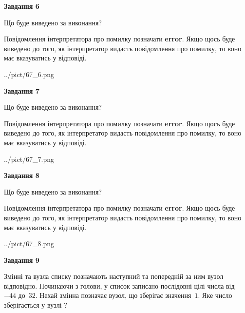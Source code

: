 \documentclass[12pt, ukrainian]{article}
\begin{document}
{\begin {large}
{\begin {center}\textbf{Завдання 6}\end {center}}\par
Що буде виведено за виконання?

Повідомлення інтерпретатора про помилку позначати \textbf{error}.
Якщо щось буде виведено до того, як інтерпретатор видасть повідомлення про помилку, 
то воно має вказуватись у відповіді. \par


\begin{center}
	{../pict/67_6.png}
\end{center}
\newpage

{\begin {center}\textbf{Завдання 7}\end {center}}\par
Що буде виведено за виконання?

Повідомлення інтерпретатора про помилку позначати \textbf{error}.
Якщо щось буде виведено до того, як інтерпретатор видасть повідомлення про помилку, 
то воно має вказуватись у відповіді. \par


\begin{center}
	{../pict/67_7.png}
\end{center}
\newpage

{\begin {center}\textbf{Завдання 8}\end {center}}\par
Що буде виведено за виконання?

Повідомлення інтерпретатора про помилку позначати \textbf{error}.
Якщо щось буде виведено до того, як інтерпретатор видасть повідомлення про помилку, 
то воно має вказуватись у відповіді. \par


\begin{center}
	{../pict/67_8.png}
\end{center}
\newpage

{\begin {center}\textbf{Завдання 9}\end {center}}\par
Змінні  та  вузла списку позначають наступний та попередній за ним вузол відповідно. Починаючи з голови, у список записано послідовні цілі числа від~$-44$ до~$32$. Нехай змінна  позначає вузол, що зберігає значення~$1$.
Яке число зберігається у вузлі  ?\par
\newpage


\end{large}}
\end{document}
